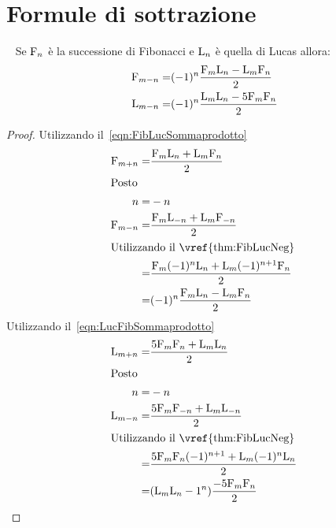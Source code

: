 \section{Formule di sottrazione}
\begin{thm}~\cite{Rabinowitz_1996}\label{thm:FibLucFormSottazione}
	Se $\mathrm{F}_{n}$ è la successione di Fibonacci e  $\mathrm{L}_{n}$ è quella di Lucas 
allora:
\begin{align}
	\mathrm{F}_{m-n}=&{}{}(-1)^n\dfrac{\mathrm{F}_{m}\mathrm{L}_{n}-\mathrm{L}_{m}\mathrm{F}_{n}}{2}\\
	\mathrm{L}_{m-n}=&{}{}(-1)^n\dfrac{\mathrm{L}_{m}\mathrm{L}_{n}-5\mathrm{F}_{m}\mathrm{F}_{n}}{2}
\end{align}
\end{thm}
\begin{proof}
Utilizzando il~\vref{eqn:FibLucSommaprodotto}
\begin{align*}
	\Fib{m+n}=&{}{}\dfrac{\Fib{m}\Luc{n}+\Luc{m}\Fib{n}}{2}\\
\intertext{Posto}
n=&{}{}-n\\
\Fib{m-n}=&{}{}\dfrac{\Fib{m}\Luc{-n}+\Luc{m}\Fib{-n}}{2}\\
\intertext{Utilizzando il~\vref{thm:FibLucNeg} }
=&{}{}\dfrac{\Fib{m}(-1)^n\Luc{n}+\Luc{m}(-1)^{n+1}\Fib{n}}{2}\\
=&{}{}(-1)^n\dfrac{\Fib{m}\Luc{n}-\Luc{m}\Fib{n}}{2}
\end{align*}
Utilizzando il~\vref{eqn:LucFibSommaprodotto}
\begin{align*}
\Luc{m+n}=&{}{}\dfrac{5\Fib{m}\Fib{n}+\Luc{m}\Luc{n}}{2}\\
\intertext{Posto}
n=&{}{}-n\\
\Luc{m-n}=&{}{}\dfrac{5\Fib{m}\Fib{-n}+\Luc{m}\Luc{-n}}{2}\\
\intertext{Utilizzando il~\vref{thm:FibLucNeg} }
=&{}{}\dfrac{5\Fib{m}\Fib{n}(-1)^{n+1}+\Luc{m}(-1)^n\Luc{n}}{2}\\
=&{}{}(\Luc{m}\Luc{n}-1^n)\dfrac{-5\Fib{m}\Fib{n}}{2}\\
\end{align*}
\end{proof}

